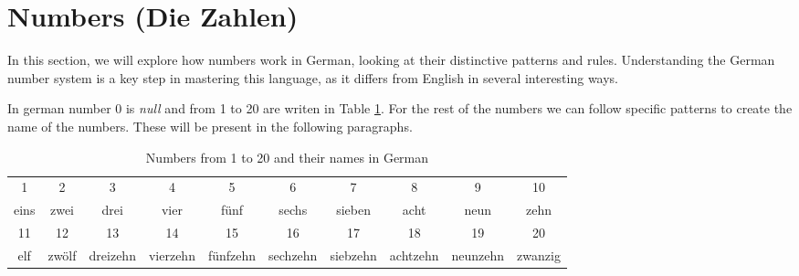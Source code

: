 \section{Numbers (Die Zahlen)}\label{sec:numbers}

In this section, we will explore how numbers work in German, looking at their distinctive patterns and rules. Understanding the German number system is a key step in mastering this language, as it differs from English in several interesting ways.

In german number 0 is \textit{null} and from 1 to 20 are writen in Table \ref{tab:numbers1.20}. For the rest of the numbers we can follow specific patterns to create the name of the numbers. These will be present in the following paragraphs.

\begin{table}[H]
    \centering
    \begin{tabular}{|c|c|c|c|c|c|c|c|c|c|}
    \hline
    1 & 2 & 3 & 4 & 5 & 6 & 7 & 8 & 9 & 10 \\
    eins & zwei & drei & vier & fünf & sechs & sieben & acht & neun & zehn \\ \hline
    11 & 12 & 13 & 14 & 15 & 16 & 17 & 18 & 19 & 20 \\
    elf & zwölf & dreizehn & vierzehn & fünfzehn & sechzehn & siebzehn & achtzehn & neunzehn & zwanzig \\ \hline
    \end{tabular}
    \caption{Numbers from 1 to 20 and their names in German}
    \label{tab:numbers1.20}
\end{table}

